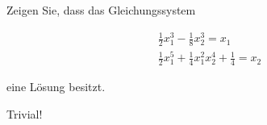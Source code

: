 \begin{exercise}

Zeigen Sie, dass das Gleichungssystem

\begin{align*}
  \frac{1}{2}x_1^3 - \frac{1}{8}x_2^3 = x_1 \\
  \frac{1}{2}x_1^5 + \frac{1}{4}x_1^2x_2^4 + \frac{1}{4} = x_2
\end{align*}

eine Lösung besitzt.

\end{exercise}

\begin{solution}

Trivial!

\end{solution}
